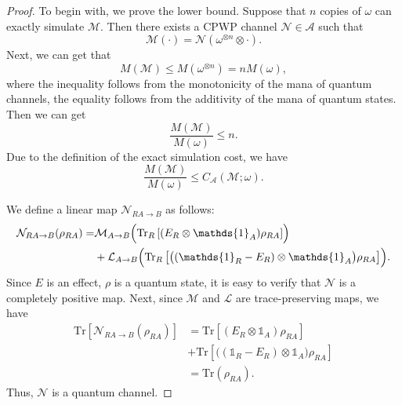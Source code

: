 \documentclass[aps,pra,twocolumn,floatfix,amsfonts,10pt]{revtex4-2}
\begin{document}
\begin{proof}
	To begin with, we prove the lower bound. 
	Suppose that $n$ copies of $\omega$ can exactly simulate $\mathcal{M}$. 
	Then there exists a CPWP channel $\mathcal{N} \in \mathcal{A}$ such that
	\begin{equation}
		\mathcal{M}(\cdot) = \mathcal{N}\left(\omega^{\otimes n}\otimes\cdot\right).
	\end{equation}
	Next, we can get that
	\begin{equation}
			M(\mathcal{M}) \leqslant M (\omega^{\otimes n}) = nM(\omega),
	\end{equation}
	where the inequality follows from the monotonicity of the mana of quantum channels, the equality follows from the additivity of the mana of quantum states.
	Then we can get
	\begin{equation}
		\frac{M(\mathcal{M})}{M(\omega)} \leqslant n.
	\end{equation}
	Due to the definition of the exact simulation cost, we have
	\begin{equation}
		\frac{M(\mathcal{M})}{M(\omega)} \leqslant C_{\mathcal{A}}(\mathcal{M};\omega).
	\end{equation}
	
	We define a linear map $\mathcal{N}_{RA\rightarrow B}$ as follows:
	\begin{equation}\label{definition of N}
		\begin{aligned}
			\mathcal{N}_{RA\rightarrow B}(\rho_{RA}) =& \mathcal{M}_{A\rightarrow B}\Bigl(\mathrm{Tr}_R\left[(E_R\otimes\mathds{1}_A)\rho_{RA}\right]\Bigr) \\ &+ \mathcal{L}_{A\rightarrow B}\Bigl(\mathrm{Tr}_R\left[\bigl((\mathds{1}_R-E_R)\otimes\mathds{1}_A\bigr)\rho_{RA}\right]\Bigr).
		\end{aligned}
	\end{equation}
	Since $E$ is an effect, $\rho$ is a quantum state, it is easy to verify that $\mathcal{N}$ is a completely positive map.
	Next, since $\mathcal{M}$ and $\mathcal{L}$ are trace-preserving maps, we have
	\begin{equation}
		\begin{aligned}
			\mathrm{Tr}\left[\mathcal{N}_{RA\rightarrow B}(\rho_{RA})\right] &= \mathrm{Tr}\left[ (E_R\otimes\mathds{1}_A)\rho_{RA} \right] \\&+ \mathrm{Tr}\left[\bigl((\mathds{1}_R-E_R)\otimes\mathds{1}_A\bigr)\rho_{RA}\right]  \\ &= \mathrm{Tr}(\rho_{RA}).
		\end{aligned}
	\end{equation}
	Thus, $\mathcal{N}$ is a quantum channel.
	

\end{proof}
\end{document}
